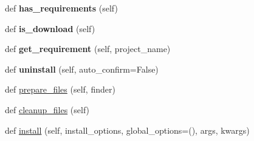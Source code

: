 \begin{DoxyCompactItemize}
\mbox{\label{classpip_1_1req_1_1req__set_1_1_requirement_set_aef63abe24fe3ccfb3561483c58332ae4}} 
def {\bfseries has\+\_\+requirements} (self)
\item 
\mbox{\label{classpip_1_1req_1_1req__set_1_1_requirement_set_a89dcc99f372cf40c324e70dec48fecfc}} 
def {\bfseries is\+\_\+download} (self)
\item 
\mbox{\label{classpip_1_1req_1_1req__set_1_1_requirement_set_ae5df932b7eb2b2a1fcc40b739463df44}} 
def {\bfseries get\+\_\+requirement} (self, project\+\_\+name)
\item 
\mbox{\label{classpip_1_1req_1_1req__set_1_1_requirement_set_a0bec66f0c12d89f196a05524cd001231}} 
def {\bfseries uninstall} (self, auto\+\_\+confirm=False)
\item 
def \hyperlink{classpip_1_1req_1_1req__set_1_1_requirement_set_acf58efdb58f90e8454128e6c3467963e}{prepare\+\_\+files} (self, finder)
\item 
def \hyperlink{classpip_1_1req_1_1req__set_1_1_requirement_set_ad5c331a8b97315aa831ed8b6f781119b}{cleanup\+\_\+files} (self)
\item 
def \hyperlink{classpip_1_1req_1_1req__set_1_1_requirement_set_a5fc5856a0f940e3ad65734be3f360e6c}{install} (self, install\+\_\+options, global\+\_\+options=(), args, kwargs)
\end{DoxyCompactItemize}
